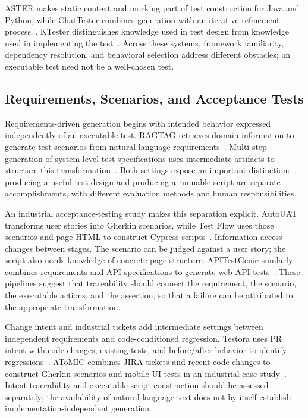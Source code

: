 ASTER makes static context and mocking part of test construction for Java and Python, while ChatTester combines generation with an iterative refinement process~\cite{U12,U18}. KTester distinguishes knowledge used in test design from knowledge used in implementing the test~\cite{U15}. Across these systems, framework familiarity, dependency resolution, and behavioral selection address different obstacles; an executable test need not be a well-chosen test.

\subsection{Requirements, Scenarios, and Acceptance Tests}
Requirements-driven generation begins with intended behavior expressed independently of an executable test. RAGTAG retrieves domain information to generate test scenarios from natural-language requirements~\cite{R01}. Multi-step generation of system-level test specifications uses intermediate artifacts to structure this transformation~\cite{R02}. Both settings expose an important distinction: producing a useful test design and producing a runnable script are separate accomplishments, with different evaluation methods and human responsibilities.

An industrial acceptance-testing study makes this separation explicit. AutoUAT transforms user stories into Gherkin scenarios, while Test Flow uses those scenarios and page HTML to construct Cypress scripts~\cite{R03}. Information access changes between stages. The scenario can be judged against a user story; the script also needs knowledge of concrete page structure. APITestGenie similarly combines requirements and API specifications to generate web API tests~\cite{R04}. These pipelines suggest that traceability should connect the requirement, the scenario, the executable actions, and the assertion, so that a failure can be attributed to the appropriate transformation.

Change intent and industrial tickets add intermediate settings between independent requirements and code-conditioned regression. Testora uses PR intent with code changes, existing tests, and before/after behavior to identify regressions~\cite{R05}. AToMIC combines JIRA tickets and recent code changes to construct Gherkin scenarios and mobile UI tests in an industrial case study~\cite{R06}. Intent traceability and executable-script construction should be assessed separately; the availability of natural-language text does not by itself establish implementation-independent generation.

